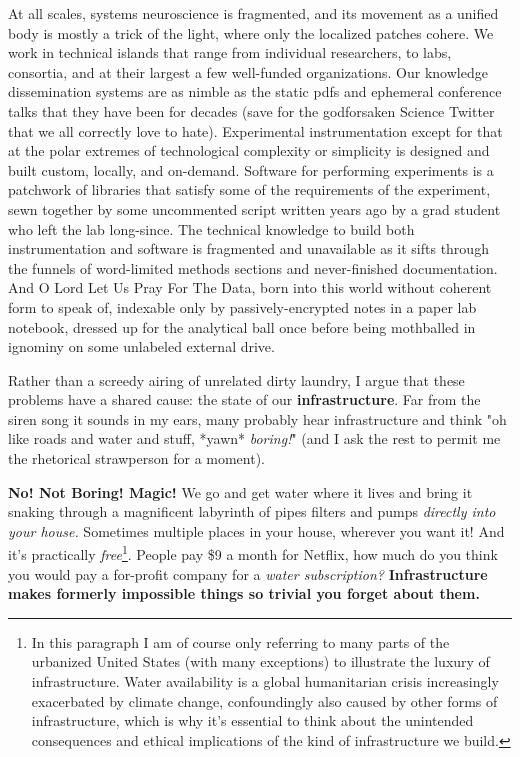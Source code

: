\documentclass{article}
\begin{document}
At all scales, systems neuroscience is fragmented, and its movement as a
unified body is mostly a trick of the light, where only the localized
patches cohere. We work in technical islands that range from individual
researchers, to labs, consortia, and at their largest a few well-funded
organizations. Our knowledge dissemination systems are as nimble as the
static pdfs and ephemeral conference talks that they have been for
decades (save for the godforsaken Science Twitter that we all correctly
love to hate). Experimental instrumentation except for that at the polar
extremes of technological complexity or simplicity is designed and built
custom, locally, and on-demand. Software for performing experiments is a
patchwork of libraries that satisfy some of the requirements of the
experiment, sewn together by some uncommented script written years ago
by a grad student who left the lab long-since. The technical knowledge
to build both instrumentation and software is fragmented and unavailable
as it sifts through the funnels of word-limited methods sections and
never-finished documentation. And O Lord Let Us Pray For The Data, born
into this world without coherent form to speak of, indexable only by
passively-encrypted notes in a paper lab notebook, dressed up for the
analytical ball once before being mothballed in ignominy on some
unlabeled external drive.


Rather than a screedy airing of unrelated dirty laundry, I argue that
these problems have a shared cause: the state of our
\textbf{infrastructure}. Far from the siren song it sounds in my ears,
many probably hear infrastructure and think "oh like roads and water and
stuff, *yawn* \emph{boring!}" (and I ask the rest to permit me the
rhetorical strawperson for a moment).

\textbf{No! Not Boring! Magic!} We go and get water where it lives and
bring it snaking through a magnificent labyrinth of pipes filters and
pumps \emph{directly into your house.} Sometimes multiple places in your
house, wherever you want it! And it's practically
\emph{free}\footnote{In this paragraph I am of course only referring to
  many parts of the urbanized United States (with many exceptions) to
  illustrate the luxury of infrastructure. Water availability is a
  global humanitarian crisis increasingly exacerbated by climate change,
  confoundingly also caused by other forms of infrastructure, which is
  why it's essential to think about the unintended consequences and
  ethical implications of the kind of infrastructure we build.}. People
pay \$9 a month for Netflix, how much do you think you would pay a
for-profit company for a \emph{water subscription?}
\textbf{Infrastructure makes formerly impossible things so trivial you
forget about them.}
\end{document}
